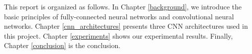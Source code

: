 This report is organized as follows. In Chapter \ref{background}, we introduce the basic principles of fully-connected neural networks and convolutional neural networks. Chapter \ref{cnn_architectures} presents three CNN architectures used in this project. Chapter \ref{experiments} shows our experimental results. Finally, Chapter \ref{conclusion} is the conclusion.

